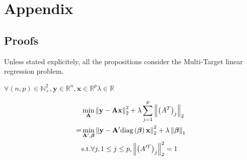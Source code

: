 \section{Appendix}
\subsection{Proofs}
Unless stated explicitely, all the propositions consider the Multi-Target linear regression problem.
\begin{proposition}
\label{gps_equivalence}
  $\forall (n, p) \in \mathbb{N}_+^2, \bm{y} \in \mathbb{R}^{n}, \bm{x} \in \mathbb{R}^{p} \lambda \in \mathbb{R}$
  
  \begin{align*}
    & \min_{\bf{A}} \left\lVert\bf{y} - \bf{A}\bf{x}\right\rVert_2^2 + \lambda \sum_{j=1}^p \left\lVert\left(A^T\right)_j\right\rVert_2 \\
     = &\min_{\bf{A'}, \bm{\beta}} \left\lVert\bf{y} - \bf{A'}\text{diag}\left(\bm{\beta}\right)\bf{x}\right\rVert_2^2 + \lambda \left\lVert\bm{\beta}\right\rVert_1 \\
     & \text{s.t.} \forall j, 1 \leq j \leq p, \left\lVert\left(A'^T\right)_j\right\rVert_2^2 = 1
  \end{align*}
\end{proposition}

